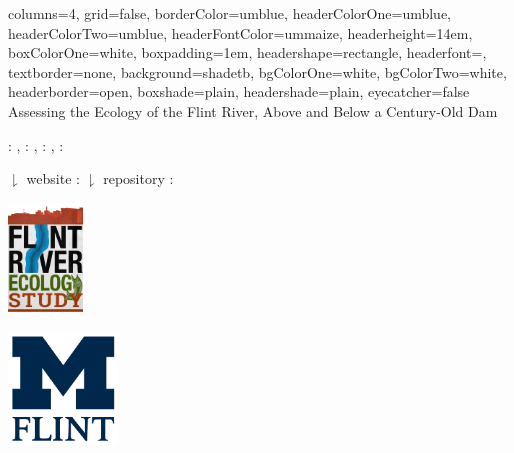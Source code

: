 \documentclass[b0paper,margin=1cm,landscape]{baposter}
\begin{document}

\begin{poster}{
  columns=4,
	grid=false,
	borderColor=umblue,
	headerColorOne=umblue,
	headerColorTwo=umblue,
	headerFontColor=ummaize,
  headerheight=14em,
	boxColorOne=white,
  boxpadding=1em,
	headershape=rectangle,
	headerfont=\Large\textsf,
	textborder=none,
	background=shadetb,
  bgColorOne=white,
  bgColorTwo=white,
	headerborder=open,
  boxshade=plain,
  headershade=plain,
  eyecatcher=false
}
{
}
{Assessing the Ecology of the Flint River, Above and Below a Century-Old Dam}
{
  \vspace{0mm}
   : \textit{\color{violet}{summersj@umich.edu}}, 
   : \textit{\color{violet}{arelkins@umich.edu}}, 
   : \textit{\color{violet}{casonk@umich.edu}}, 
   : \textit{\color{violet}{hdawson@umich.edu}} 
  
  \hspace{1mm} $\downharpoonright$ website : \textit{\color{violet}{https://flintriverecostudy.com}}
  \hspace{1mm} $\downharpoonright$ repository : \textit{\color{violet}{https://github.com/casonk/Flint\_River\_Ecology}}

}
{
  \begin{minipage}{8.0em}
    \includegraphics[height=8em]{Img/Ecology_Study.png}
  \end{minipage}
  \begin{minipage}{8.0em}
    \includegraphics[height=8em]{Img/University_of_Michigan_Flint.png}
  \end{minipage}
}


\end{poster}
\end{document}
